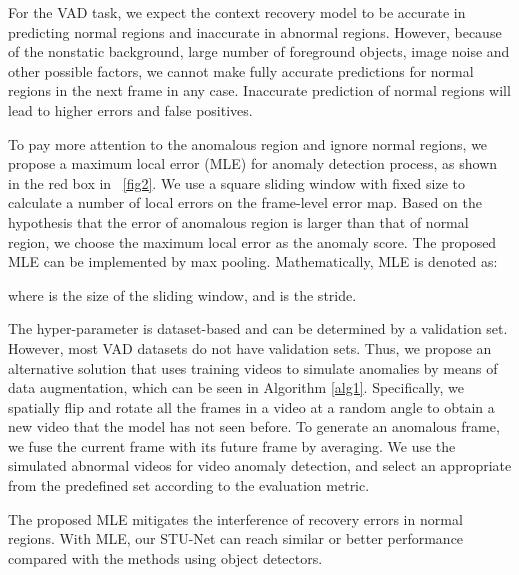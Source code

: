\documentclass[lettersize,journal]{IEEEtran}
\begin{document}
For the VAD task, we expect the context recovery model to be accurate in predicting normal regions and inaccurate in abnormal regions.
However, because of the nonstatic background, large number of foreground objects, image noise and other possible factors, we cannot make fully accurate predictions for normal regions in the next frame in any case.
Inaccurate prediction of normal regions will lead to higher errors and false positives.

To pay more attention to the anomalous region and ignore normal regions, we propose a maximum local error (MLE) for anomaly detection process, as shown in the red box in \figurename~\ref{fig2}.
We use a square sliding window with fixed size to calculate a number of local errors on the frame-level error map.
Based on the hypothesis that the error of anomalous region is larger than that of normal region, we choose the maximum local error as the anomaly score.
The proposed MLE can be implemented by max pooling.
Mathematically, MLE is denoted as:

where  is the size of the sliding window, and  is the stride.

The hyper-parameter  is dataset-based and can be determined by a validation set.
However, most VAD datasets do not have validation sets.
Thus, we propose an alternative solution that uses training videos to simulate anomalies by means of data augmentation, which can be seen in Algorithm \ref{alg1}.
Specifically, we spatially flip and rotate all the frames in a video at a random angle to obtain a new video that the model has not seen before.
To generate an anomalous frame, we fuse the current frame with its future frame by averaging.
We use the simulated abnormal videos for video anomaly detection, and select an appropriate  from the predefined set  according to the evaluation metric.

The proposed MLE mitigates the interference of recovery errors in normal regions.
With MLE, our STU-Net can reach similar or better performance compared with the methods using object detectors.
\end{document}
